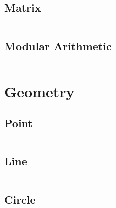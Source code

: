 \documentclass[8pt,a4paper,landscape,oneside]{amsart}
\begin{document}
\begin{multicols*}{2}
\begin{multicols*}{2}
		\subsection{Matrix}
		\inputminted[firstline=18,lastline=67]{c++}{_code/maths/matrix.cpp}
		\vfill\null
		\columnbreak
		\subsection{Modular Arithmetic}
		\inputminted[firstline=15,lastline=40]{c++}{_code/maths/mod.cpp}
		\vfill\null
	\end{multicols*}
	\vfill\null
	\newpage
	\section{Geometry}
	\begin{multicols*}{2}
		\subsection{Point}
		\inputminted[firstline=23,lastline=48]{c++}{_code/geometry/point.cpp}
		\subsection{Line}
		\inputminted[firstline=24,lastline=47]{c++}{_code/geometry/line.cpp}
		\vfill\null
		\columnbreak
		\subsection{Circle}
		\inputminted[firstline=25,lastline=69]{c++}{_code/geometry/circ.cpp}
		\vfill\null
	\end{multicols*}
	\end{multicols*}
\end{document}
